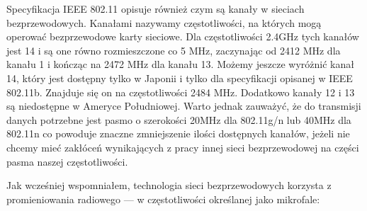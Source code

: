 Specyfikacja IEEE 802.11 opisuje również czym są kanały w sieciach bezprzewodowych. Kanałami nazywamy częstotliwości, na których mogą operować bezprzewodowe karty sieciowe. Dla częstotliwości 2.4GHz tych kanałów jest 14 i są one równo rozmieszczone co 5 MHz, zaczynając od 2412 MHz dla kanału 1 i kończąc na 2472 MHz dla kanału 13. Możemy jeszcze wyróżnić kanał 14, który jest dostępny tylko w Japonii i tylko dla specyfikacji opisanej w IEEE 802.11b. Znajduje się on na częstotliwości 2484 MHz. Dodatkowo kanały 12 i 13 są niedostępne w Ameryce Południowej. Warto jednak zauważyć, że do transmisji danych potrzebne jest pasmo o szerokości 20MHz dla 802.11g/n lub 40MHz dla 802.11n co powoduje znaczne zmniejszenie ilości dostępnych kanałów, jeżeli nie chcemy mieć zakłóceń wynikających z pracy innej sieci bezprzewodowej na części pasma naszej częstotliwości.\cite{WifiChannelsWiki}

Jak wcześniej wspomniałem, technologia sieci bezprzewodowych korzysta z promieniowania radiowego — w częstotliwości określanej jako mikrofale:\cite{FaleRadioweWiki}

